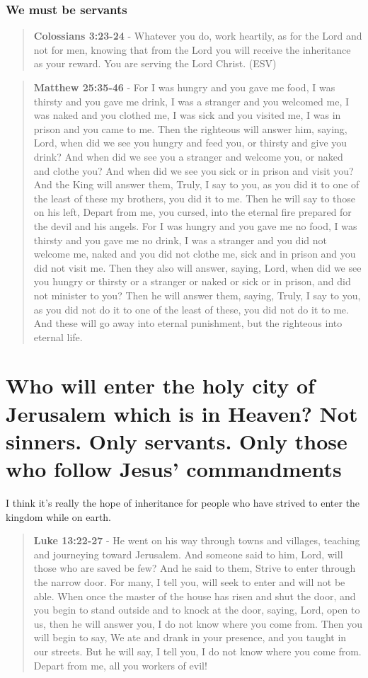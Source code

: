 \documentclass[11pt]{article}
\begin{document}
\subsubsection{We must be servants}
\label{sec:orgeb78063}
\begin{quote}
\textbf{Colossians 3:23-24} -  Whatever you do, work heartily, as for the Lord and not for men, knowing that from the Lord you will receive the inheritance as your reward. You are serving the Lord Christ.  (ESV)
\end{quote}

\begin{quote}
\textbf{Matthew 25:35-46} - For I was hungry and you gave me food, I was thirsty and you gave me drink, I was a stranger and you welcomed me, I was naked and you clothed me, I was sick and you visited me, I was in prison and you came to me. Then the righteous will answer him, saying, Lord, when did we see you hungry and feed you, or thirsty and give you drink? And when did we see you a stranger and welcome you, or naked and clothe you? And when did we see you sick or in prison and visit you? And the King will answer them, Truly, I say to you, as you did it to one of the least of these my brothers, you did it to me. Then he will say to those on his left, Depart from me, you cursed, into the eternal fire prepared for the devil and his angels. For I was hungry and you gave me no food, I was thirsty and you gave me no drink, I was a stranger and you did not welcome me, naked and you did not clothe me, sick and in prison and you did not visit me. Then they also will answer, saying, Lord, when did we see you hungry or thirsty or a stranger or naked or sick or in prison, and did not minister to you? Then he will answer them, saying, Truly, I say to you, as you did not do it to one of the least of these, you did not do it to me. And these will go away into eternal punishment, but the righteous into eternal life.
\end{quote}

\section{Who will enter the holy city of Jerusalem which is in Heaven? Not sinners. Only servants. Only those who follow Jesus' commandments}
\label{sec:org3497a6d}
I think it's really the hope of inheritance for people who have strived to enter the kingdom while on earth.

\begin{quote}
\textbf{Luke 13:22-27} - He went on his way through towns and villages, teaching and journeying toward Jerusalem. And someone said to him, Lord, will those who are saved be few? And he said to them, Strive to enter through the narrow door. For many, I tell you, will seek to enter and will not be able. When once the master of the house has risen and shut the door, and you begin to stand outside and to knock at the door, saying, Lord, open to us, then he will answer you, I do not know where you come from. Then you will begin to say, We ate and drank in your presence, and you taught in our streets. But he will say, I tell you, I do not know where you come from. Depart from me, all you workers of evil!
\end{quote}
\end{document}
